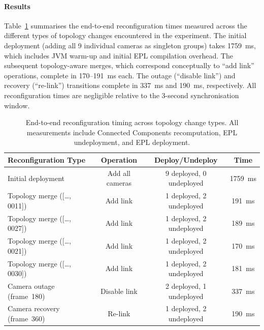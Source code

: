 \documentclass[5p,times]{elsarticle}
\begin{document}
\paragraph{Results}
Table~\ref{tab:reconfiguration_timings} summarises the end-to-end reconfiguration times measured across the different types of topology changes encountered in the experiment. The initial deployment (adding all 9 individual cameras as singleton groups) takes 1759~ms, which includes JVM warm-up and initial EPL compilation overhead. The subsequent topology-aware merges, which correspond conceptually to ``add link'' operations, complete in 170--191~ms each. The outage (``disable link'') and recovery (``re-link'') transitions complete in 337~ms and 190~ms, respectively. All reconfiguration times are negligible relative to the 3-second synchronisation window.

\begin{table}[tbh!]
    \centering
    \caption{End-to-end reconfiguration timing across topology change types. All measurements include Connected Components recomputation, EPL undeployment, and EPL deployment.}
    \label{tab:reconfiguration_timings}
    \begin{tabular}{@{}lccc@{}}
        \toprule
        \textbf{Reconfiguration Type} & \textbf{Operation} & \textbf{Deploy/Undeploy} & \textbf{Time} \\ \midrule
        Initial deployment & Add all cameras & 9 deployed, 0 undeployed & 1759~ms \\
        Topology merge ([\ldots, 0011]) & Add link & 1 deployed, 2 undeployed & 191~ms \\
        Topology merge ([\ldots, 0027]) & Add link & 1 deployed, 2 undeployed & 189~ms \\
        Topology merge ([\ldots, 0021]) & Add link & 1 deployed, 2 undeployed & 170~ms \\
        Topology merge ([\ldots, 0030]) & Add link & 1 deployed, 2 undeployed & 181~ms \\
        Camera outage (frame~180) & Disable link & 2 deployed, 1 undeployed & 337~ms \\
        Camera recovery (frame~360) & Re-link & 1 deployed, 2 undeployed & 190~ms \\ \bottomrule
    \end{tabular}
\end{table}
\end{document}
